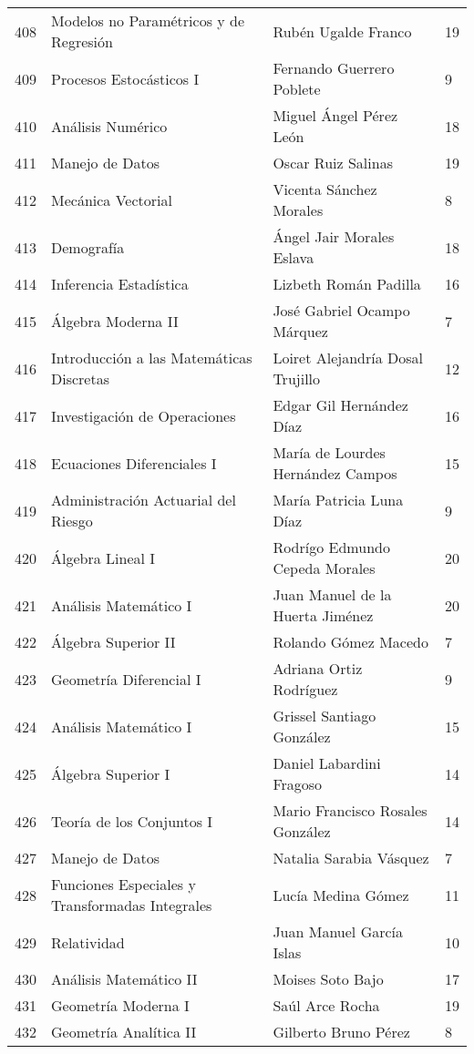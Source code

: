 \begin{table}[ht]
\begin{tabular}{rlll}
  408 & Modelos no Paramétricos y de Regresión & Rubén Ugalde Franco & 19 \\ 
  409 & Procesos Estocásticos I & Fernando Guerrero Poblete & 9 \\ 
  410 & Análisis Numérico & Miguel Ángel Pérez León & 18 \\ 
  411 & Manejo de Datos & Oscar Ruiz Salinas & 19 \\ 
  412 & Mecánica Vectorial & Vicenta Sánchez Morales & 8 \\ 
  413 & Demografía & Ángel Jair Morales Eslava & 18 \\ 
  414 & Inferencia Estadística & Lizbeth Román Padilla & 16 \\ 
  415 & Álgebra Moderna II & José Gabriel Ocampo Márquez & 7 \\ 
  416 & Introducción a las Matemáticas Discretas & Loiret Alejandría Dosal Trujillo & 12 \\ 
  417 & Investigación de Operaciones & Edgar Gil Hernández Díaz & 16 \\ 
  418 & Ecuaciones Diferenciales I & María de Lourdes Hernández Campos & 15 \\ 
  419 & Administración Actuarial del Riesgo & María Patricia Luna Díaz & 9 \\ 
  420 & Álgebra Lineal I & Rodrígo Edmundo Cepeda Morales & 20 \\ 
  421 & Análisis Matemático I & Juan Manuel de la Huerta Jiménez & 20 \\ 
  422 & Álgebra Superior II & Rolando Gómez Macedo & 7 \\ 
  423 & Geometría Diferencial I & Adriana Ortiz Rodríguez & 9 \\ 
  424 & Análisis Matemático I & Grissel Santiago González & 15 \\ 
  425 & Álgebra Superior I & Daniel Labardini Fragoso & 14 \\ 
  426 & Teoría de los Conjuntos I & Mario Francisco Rosales González & 14 \\ 
  427 & Manejo de Datos & Natalia Sarabia Vásquez & 7 \\ 
  428 & Funciones Especiales y Transformadas Integrales & Lucía Medina Gómez & 11 \\ 
  429 & Relatividad & Juan Manuel García Islas & 10 \\ 
  430 & Análisis Matemático II & Moises Soto Bajo & 17 \\ 
  431 & Geometría Moderna I & Saúl Arce Rocha & 19 \\ 
  432 & Geometría Analítica II & Gilberto Bruno Pérez & 8 \\ 

\end{tabular}
\end{table}
